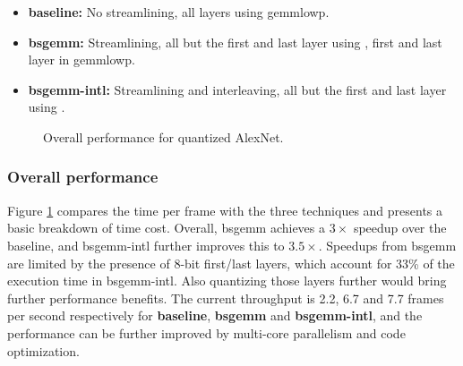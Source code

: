\documentclass[sigconf]{acmart}
\begin{document}
\begin{itemize}
	\item \textbf{baseline:} No streamlining, all layers using gemmlowp.
	\item \textbf{bsgemm:} Streamlining, all but the first and last layer using \ours{}, first and last layer in gemmlowp.
	\item \textbf{bsgemm-intl:} Streamlining and interleaving, all but the first and last layer using \ours{} .
\end{itemize}

\begin{figure}
	\footnotesize
	\caption{Overall performance for quantized AlexNet.}
	\label{fig:breakdown}
\end{figure}

\subsubsection{Overall performance}
Figure \ref{fig:breakdown} compares the time per frame with the three techniques and presents a basic breakdown of time cost.
Overall, bsgemm achieves a $3\times$ speedup over the baseline, and bsgemm-intl further improves this to $3.5\times$.
Speedups from bsgemm are limited by the presence of 8-bit first/last layers, which account for 33\% of the execution time in bsgemm-intl.
Also quantizing those layers further would bring further performance benefits.
The current throughput is 2.2, 6.7 and 7.7 frames per second respectively for \textbf{baseline}, \textbf{bsgemm} and \textbf{bsgemm-intl}, and the performance can be further improved by multi-core parallelism and code optimization.
\end{document}

